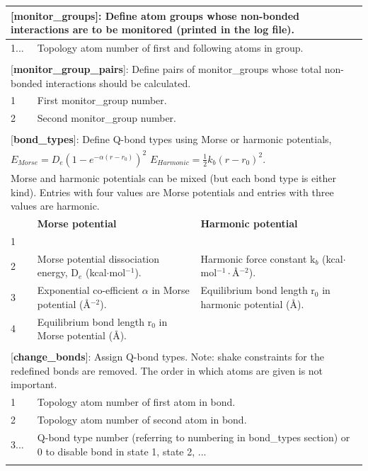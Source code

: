 \documentclass[a4paper,12pt]{article}
\begin{document}
\begin{longtable}{|p{53pt}|p{181pt}|p{160pt}|}
\multicolumn{3}{p{394pt}}{[\textbf{monitor\_groups}]: Define atom groups whose non-bonded interactions are to be monitored (printed in the log file).}\\
\hline 1... & \multicolumn{2}{p{341pt}|}{Topology atom number of first and following atoms in group.}\\
\hline
\multicolumn{3}{p{394pt}}{}\\

\multicolumn{3}{p{394pt}}{[\textbf{monitor\_group\_pairs}]: Define pairs of monitor\_groups whose total non-bonded interactions should be calculated.}\\
\hline 1 & \multicolumn{2}{p{341pt}|}{First monitor\_group number.}\\
\hline 2 & \multicolumn{2}{p{341pt}|}{Second monitor\_group number.}\\
\hline
\multicolumn{3}{p{394pt}}{}\\

\multicolumn{3}{p{394pt}}{[\textbf{bond\_types}]: Define Q-bond types using Morse or harmonic potentials,}\\
\multicolumn{3}{p{394pt}}{$E_{Morse}=D_e \left(1-e^{-\alpha\left(r-r_0\right)}\right)^2$   $E_{Harmonic}=\frac{1}{2}k_b\left(r-r_0\right)^2$.}\\
\multicolumn{3}{p{394pt}}{Morse and harmonic potentials can be mixed (but each bond type is either kind). Entries with four values are Morse potentials and entries with three values are harmonic.}\\
\hline & \textbf{Morse potential} & \textbf{Harmonic potential}\\
\hline 1 & \multicolumn{2}{p{341pt}|}{\centering{Q-bond type number (starting with 1).}}\\
\hline 2 & Morse potential dissociation energy, D$_e$ (kcal$\cdot$mol$^{-1}$). &  Harmonic force constant k$_b$ (kcal$\cdot$mol$^{-1}\cdot${\AA}$^{-2}$).\\
\hline 3 & Exponential co-efficient $\alpha$ in Morse potential ({\AA}$^{-2}$). & Equilibrium bond length r$_0$ in harmonic potential ({\AA}).\\
\hline 4 & Equilibrium bond length r$_0$ in Morse potential ({\AA}).&\\
\hline
\multicolumn{3}{p{394pt}}{}\\

\multicolumn{3}{p{394pt}}{[\textbf{change\_bonds}]: Assign Q-bond types. Note: shake constraints for the redefined bonds are removed. The order in which atoms are given is not important.}\\
\hline 1 & \multicolumn{2}{p{341pt}|}{Topology atom number of first atom in bond.}\\
\hline 2 & \multicolumn{2}{p{341pt}|}{Topology atom number of second atom in bond.}\\
\hline 3... & \multicolumn{2}{p{341pt}|}{Q-bond type number (referring to numbering in bond\_types section) or 0 to disable bond in state 1, state 2, ...}\\
\hline
\multicolumn{3}{p{394pt}}{}\\


\end{longtable}
\end{document}
